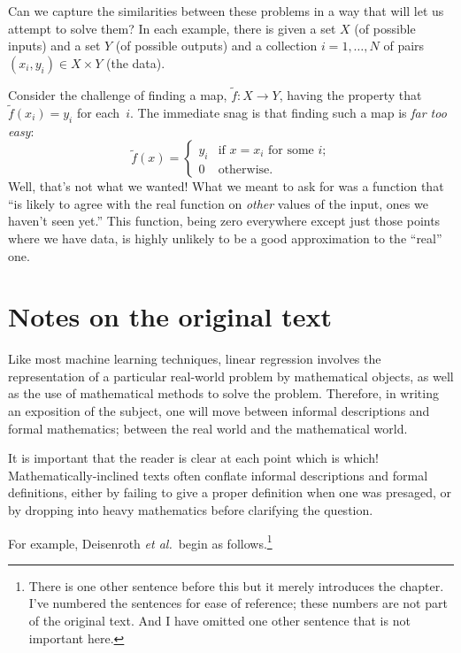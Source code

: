 \documentclass[11pt, a4paper]{article}
\begin{document}
Can we capture the similarities between these problems in a way that
will let us attempt to solve them? In each example, there is given a
set $X$ (of possible inputs) and a set $Y$ (of possible outputs) and a
collection $i=1,\dots,N$ of pairs $(x_i, y_i)\in X\times Y$ (the data).

Consider the challenge of finding a map, $\tilde{f}\colon X\to Y$,
having the property that $\tilde{f}(x_i)= y_i$ for each~$i$. The
immediate snag is that finding such a map is \emph{far too easy}:
\begin{equation*}
  \tilde{f}(x) =
  \begin{cases}
    y_i & \text{if $x = x_i$ for some $i$;} \\
      0 & \text{otherwise}.
  \end{cases}
\end{equation*}
Well, that's not what we wanted! What we meant to ask for was a
function that “is likely to agree with the real function on
\emph{other} values of the input, ones we haven't seen yet.” This
function, being zero everywhere except just those points where we have
data, is highly unlikely to be a good approximation to the “real” one.









\section*{Notes on the original text}

Like most machine learning techniques, linear regression involves the
representation of a particular real-world problem by mathematical
objects, as well as the use of mathematical methods to solve the
problem. Therefore, in writing an exposition of the subject, one will
move between informal descriptions and formal mathematics; between the
real world and the mathematical world.

It is important that the reader is clear at each point which is which!
Mathematically-inclined texts often conflate informal descriptions and
formal definitions, either by failing to give a proper definition when
one was presaged, or by dropping into heavy mathematics before
clarifying the question. 

For example, Deisenroth \emph{et al.}\ begin as
follows.\footnote{There is one other sentence before this but it
merely introduces the chapter. I've numbered the sentences for ease of
reference; these numbers are not part of the original text. And I have
omitted one other sentence that is not important here.}
\end{document}
